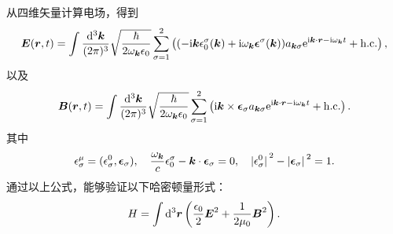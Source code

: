 从四维矢量计算电场，得到
\begin{equation}
    \vb*{E}(\vb*{r}, t) = \int \frac{\dd[3]{\vb*{k}}}{(2\pi)^3} \sqrt{\frac{\hbar}{2\omega_{\vb*{k}} \epsilon_0}} \sum_{\sigma=1}^2 \left( (- \mathrm{i} \vb*{k} \epsilon_0^\sigma(\vb*{k}) + \mathrm{i} \omega_{\vb*{k}} \vb*{\epsilon}^\sigma(\vb*{k})) a_{\vb*{k} \sigma} \mathrm{e}^{\mathrm{i} \vb*{k} \cdot \vb*{r} - \mathrm{i} \omega_{\vb*{k}} t} + \text{h.c.} \right),
\end{equation}
以及
\begin{equation}
    \vb*{B}(\vb*{r}, t) = \int \frac{\dd[3]{\vb*{k}}}{(2\pi)^3} \sqrt{\frac{\hbar}{2\omega_{\vb*{k}} \epsilon_0}} \sum_{\sigma=1}^2 \left( \mathrm{i} \vb*{k} \times \vb*{\epsilon}_\sigma a_{\vb*{k} \sigma} \mathrm{e}^{\mathrm{i} \vb*{k} \cdot \vb*{r} - \mathrm{i} \omega_{\vb*{k}} t } + \text{h.c.} \right).
\end{equation}
其中
\begin{equation}
    \epsilon^\mu_\sigma = (\epsilon_\sigma^0, \vb*{\epsilon}_\sigma), \quad \frac{\omega_{\vb*{k}}}{c} \epsilon_0^\sigma - \vb*{k} \cdot \vb*{\epsilon}_\sigma = 0, \quad \abs*{\epsilon_\sigma^0}^2 - \abs*{\vb*{\epsilon}_\sigma}^2 = 1.
\end{equation}
通过以上公式，能够验证以下哈密顿量形式：
\begin{equation}
    H = \int \dd[3]{\vb*{r}} \left( \frac{\epsilon_0}{2} \vb*{E}^2 + \frac{1}{2\mu_0} \vb*{B}^2 \right).
    \label{eq:e-and-b-hamiltonian}
\end{equation}

